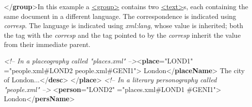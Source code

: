 \begin{reflist}
\begin{sansreflist}
\begin{reflist}
{</\textbf{group}>}In this example a \hyperref[TEI.group]{<group>} contains two \hyperref[TEI.text]{<text>}s, each containing the same document in a different language. The correspondence is indicated using {\itshape corresp}. The language is indicated using {\itshape xml:lang}, whose value is inherited; both the tag with the {\itshape corresp} and the tag pointed to by the {\itshape corresp} inherit the value from their immediate parent.
    \item[]\exampleFont \mbox{}\newline 
\textit{<!-- In a placeography called "places.xml" -->}{<\textbf{place}\hspace*{1em}{xml:id}="{LOND1}"\mbox{}\newline 
\hspace*{1em}{corresp}="{people.xml\#LOND2 people.xml\#GENI1}">}\mbox{}\newline 
{}London{</\textbf{placeName}>}\mbox{}\newline 
{}The city of London...{</\textbf{desc}>}\mbox{}\newline 
{</\textbf{place}>}\mbox{}\newline 
\textit{<!-- In a literary personography called "people.xml" -->}\mbox{}\newline 
{<\textbf{person}\hspace*{1em}{xml:id}="{LOND2}"\mbox{}\newline 
\hspace*{1em}{corresp}="{places.xml\#LOND1 \#GENI1}">}\mbox{}\newline 
{}London{</\textbf{persName}>}\mbox{}\newline 

\end{reflist}
\end{sansreflist}
\end{reflist}

